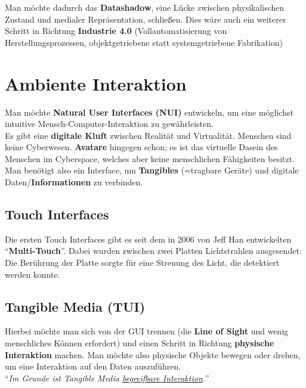 \documentclass[a4paper]{article}
\begin{document}
Man möchte dadurch das \textbf{Datashadow}, eine Lücke zwischen physikalischen Zustand und medialer Repräsentation, schließen. Dies wäre auch ein weiterer Schritt in Richtung \textbf{Industrie 4.0} (Vollautomatisierung von Herstellungsprozessen, objektgetriebene statt systemgetriebene Fabrikation)

\newpage
\section{Ambiente Interaktion}
Man möchte \textbf{Natural User Interfaces (NUI)} entwickeln, um eine möglichst intuitive Mensch-Computer-Interaktion zu gewährleisten.\\
Es gibt eine \textbf{digitale Kluft} zwischen Realität und Virtualität. Menschen sind keine Cyberwesen. \textbf{Avatare} hingegen schon; es ist das virtuelle Dasein des Menschen im Cyberspace, welches aber keine menschlichen Fähigkeiten besitzt. Man benötigt also ein Interface, um \textbf{Tangibles} (=tragbare Geräte) und digitale Daten/\textbf{Informationen} zu verbinden.

\subsection{Touch Interfaces}
Die ersten Touch Interfaces gibt es seit dem in 2006 von Jeff Han entwickelten ``\textbf{Multi-Touch}''. Dabei wurden zwischen zwei Platten Lichtstrahlen ausgesendet: Die Berührung der Platte sorgte für eine Streuung des Licht, die detektiert werden konnte.

\subsection{Tangible Media (TUI)}
Hierbei möchte man sich von der GUI trennen (die \textbf{Line of Sight} und wenig menschliches Können erfordert) und einen Schritt in Richtung \textbf{physische Interaktion} machen. Man möchte also physische Objekte bewegen oder drehen, um eine Interaktion auf den Daten auszuführen. \\

``\textit{Im Grunde ist Tangible Media \underline{begreifbare Interaktion}.}''\\
\end{document}
